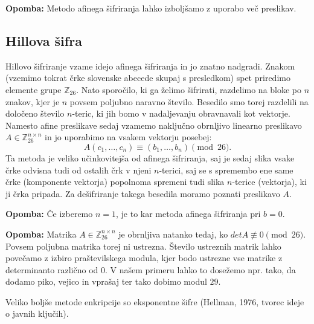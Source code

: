\documentclass[12pt, a4paper]{article}
\newenvironment{opom}[1][]{\par\medskip\noindent \textbf{Opomba: }}{\medskip}
\begin{document}
\begin{opom}
Metodo afinega šifriranja lahko izboljšamo z uporabo več preslikav.
\end{opom}

\subsection{Hillova šifra}
Hillovo šifriranje vzame idejo afinega šifriranja in jo znatno nadgradi. Znakom (vzemimo tokrat črke slovenske abecede skupaj s presledkom) spet priredimo elemente grupe $\mathbb{Z}_{26}$. Nato sporočilo, ki ga želimo šifrirati, razdelimo na bloke po $n$ znakov, kjer je $n$ povsem poljubno naravno število. Besedilo smo torej razdelili na določeno število $n$-teric, ki jih bomo v nadaljevanju obravnavali kot vektorje. Namesto afine preslikave sedaj vzamemo naključno obrnljivo linearno preslikavo $A\in \mathbb{Z}_{26}^{n\times n}$ in jo uporabimo na vsakem vektorju posebej:
$$
A(c_1,\dots,c_n)\equiv (b_1,\dots,b_n)\pmod{26}.
$$
Ta metoda je veliko učinkovitejša od afinega šifriranja, saj je sedaj slika vsake črke odvisna tudi od ostalih črk v njeni $n$-terici, saj se s spremembo ene same črke (komponente vektorja) popolnoma spremeni tudi slika $n$-terice (vektorja), ki ji črka pripada. Za dešifriranje takega besedila moramo poznati preslikavo $A$.
\begin{opom}
Če izberemo $n=1$, je to kar metoda afinega šifriranja pri $b=0$.
\end{opom}
\begin{opom}
Matrika $A\in \mathbb{Z}_{26}^{n\times n}$ je obrnljiva natanko tedaj, ko $detA\not\equiv 0 \pmod{26}$. Povsem poljubna matrika torej ni ustrezna. Število ustreznih matrik lahko povečamo z izbiro praštevilskega modula, kjer bodo ustrezne vse matrike z determinanto različno od $0$. V našem primeru lahko to dosežemo npr. tako, da dodamo piko, vejico in vprašaj ter tako dobimo modul $29$.
\end{opom}

Veliko boljše metode enkripcije so eksponentne šifre (Hellman, 1976, tvorec ideje o javnih ključih).
\end{document}
